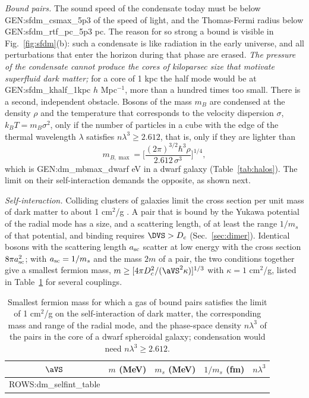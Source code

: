 \emph{Bound pairs.} The sound speed of the condensate today must be below
{{GEN:sfdm_csmax_5p3}} of the speed of light, and the Thomas-Fermi radius below
{{GEN:sfdm_rtf_pc_5p3}} pc. The reason for so strong a bound is visible in Fig.~\ref{fig:sfdm}(b):
such a condensate is like radiation in the early universe, and all perturbations that enter the
horizon during that phase are erased. \emph{The pressure of the condensate cannot produce the cores of
kiloparsec size that motivate superfluid dark matter;} for a core of 1 kpc the half mode would be at
{{GEN:sfdm_khalf_1kpc}} $h$ Mpc$^{-1}$, more than a hundred times too small. There is a second,
independent obstacle. Bosons of the mass $m_B$ are condensed at the density $\rho$ and the
temperature that corresponds to the velocity dispersion $\sigma$, $k_BT=m_B\sigma^2$, only if the
number of particles in a cube with the edge of the thermal wavelength $\lambda$ satisfies
$n\lambda^3\ge2.612$, that is, only if they are lighter than
\begin{equation}
m_{B,\max}=\Big[\frac{(2\pi)^{3/2}\hbar^3\rho}{2.612\,\sigma^3}\Big]^{1/4},
\label{eq:mbmax}
\end{equation}
which is {{GEN:dm_mbmax_dwarf}} eV in a dwarf galaxy (Table~\ref{tab:halos}). The limit on their
self-interaction demands the opposite, as shown next.

\emph{Self-interaction.} Colliding clusters of galaxies limit the cross section per unit mass of
dark matter to about 1 cm$^2$/g \cite{Markevitch2004,Randall2008}. A pair that is bound by the
Yukawa potential of the radial mode has a size, and a scattering length, of at least the range
$1/m_s$ of that potential, and binding requires $\DVS>D_c$ (Sec.~\ref{sec:dimer}). Identical
bosons with the scattering length $a_{\rm sc}$ scatter at low energy with the cross section $8\pi a_{\rm sc}^2$;
with $a_{\rm sc}=1/m_s$ and the mass $2m$ of a pair, the two conditions together give a smallest fermion
mass, $m\ge[4\pi D_c^2/(\aVS^2\kappa)]^{1/3}$ with $\kappa=1$ cm$^2$/g, listed in
Table~\ref{tab:selfint} for several couplings.

\begin{table}
\caption{\label{tab:selfint}Smallest fermion mass for which a gas of bound pairs satisfies the limit of
1 cm$^2$/g on the self-interaction of dark matter, the corresponding mass and range of the radial
mode, and the phase-space density $n\lambda^3$ of the pairs in the core of a dwarf spheroidal galaxy;
condensation would need $n\lambda^3\ge2.612$.}
\begin{ruledtabular}
\begin{tabular}{ccccc}
$\aVS$ & $m$ (MeV) & $m_s$ (MeV) & $1/m_s$ (fm) & $n\lambda^3$ \\
\hline
{{ROWS:dm_selfint_table}}
\end{tabular}
\end{ruledtabular}
\end{table}

